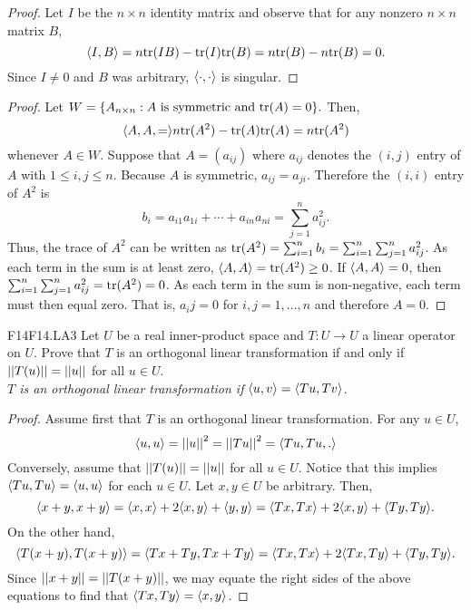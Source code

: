 \documentclass[../AlgebraQualSolutions.tex]{subfiles}
\begin{document}
    \begin{proof}
        Let $I$ be the $n \times n$ identity matrix and observe that for any nonzero $n \times n$ matrix $B$,
            \[\ip{I}{B} = n\tr(IB) - \tr(I)\tr(B) = n\tr(B) - n \tr(B) = 0.\]
        Since $I \neq 0$ and $B$ was arbitrary, $\ip{\cdot}{\cdot}$ is singular.
    \end{proof}
    
    \begin{proof}
        Let $W = \{A_{n\times n}: A \textrm{ is symmetric  and } \tr(A) = 0\}.$ Then,
            \[\ip{A,A} = n\tr(A^2) - \tr(A)\tr(A) = n\tr(A^2)\]
        whenever $A \in W$. Suppose that $A = (a_{ij})$ where $a_{ij}$ denotes the $(i,j)$ entry of $A$ with $1\leq i,j \leq n$. Because $A$ is symmetric, $a_{ij} = a_{ji}$. Therefore the $(i,i)$ entry of $A^2$ is
            \[b_i = a_{i1}a_{1i} + \cdots + a_{in}a_{ni} = \sum_{j=1}^n a_{ij}^2. \]
        Thus, the trace of $A^2$ can be written as $\tr(A^2) = \sum_{i=1}^n b_i = \sum_{i=1}^n \sum_{j=1}^n a_{ij}^2$. As each term in the sum is at least zero, $\ip{A}{A} = \tr(A^2) \geq 0$. If $\ip{A}{A} = 0$, then $\sum_{i=1}^n \sum_{j=1}^n a_{ij}^2 = \tr(A^2) = 0$. As each term in the sum is non-negative, each term must then equal zero. That is, $a_ij = 0$ for $i,j = 1, \ldots, n$ and therefore $A = 0$.
    \end{proof}
    
    \begin{prob}{F14}{F14.LA3}
        Let $U$ be a real inner-product space and $T: U \to U$ a linear operator on $U$. Prove that $T$ is an orthogonal linear transformation if and only if $\norm[T(u)] = \norm[u]$ for all $u \in U$.\\
    
        \emph{$T$ is an orthogonal linear transformation if $\ip{u}{v} = \ip{Tu}{Tv}$}.
    \end{prob}
    
    \begin{proof}
        Assume first that $T$ is an orthogonal linear transformation. For any $u \in U$,
            \[\ip{u}{u} = \norm[u]^2 = \norm[Tu]^2 = \ip{Tu,Tu}.\]
        Conversely, assume that $\norm[T(u)] = \norm[u]$ for all $u \in U$. Notice that this implies $\ip{Tu}{Tu} = \ip{u}{u}$ for each $u \in U$. Let $x, y \in U$ be arbitrary. Then,
            \[\ip{x+y}{x+y} = \ip{x}{x} + 2\ip{x}{y} + \ip{y}{y} = \ip{Tx}{Tx} + 2\ip{x}{y} + \ip{Ty}{Ty}.\]
        On the other hand,
            \[\ip{T(x+y)}{T(x+y)} = \ip{Tx + Ty}{Tx + Ty} = \ip{Tx}{Tx} + 2\ip{Tx}{Ty} + \ip{Ty}{Ty}.\]
        Since $\norm[x + y] = \norm[T(x+y)]$, we may equate the right sides of the above equations to find that $\ip{Tx}{Ty} = \ip{x}{y}$.
    \end{proof}
\end{document}

